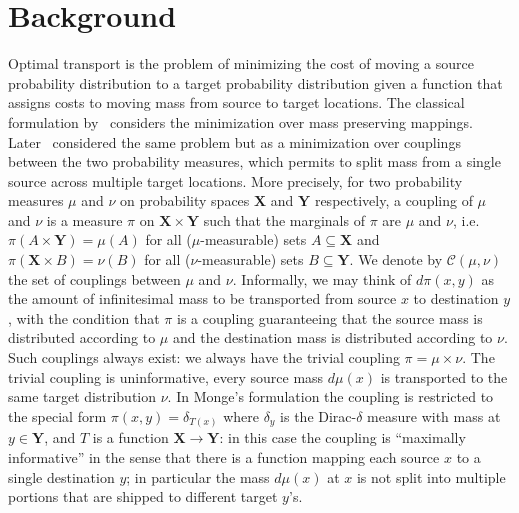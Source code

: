\documentclass[twoside,11pt]{article}
\newcommand{\coupling}[0]{\pi}
\newcommand{\Xsp}{{\mathbf{X}}}
\newcommand{\Ysp}{{\mathbf{Y}}}
\begin{document}
\section{Background}
\label{sec:background}
Optimal transport is the problem of minimizing the cost of moving a source
probability distribution to a target probability distribution given a function
that assigns costs to moving mass from source to target locations. The
classical formulation by~\citet{monge:book1781} considers the minimization over
mass preserving mappings.  Later~\citet{kantorovitch:ms1958} considered the
same problem but as a minimization over couplings between the two probability
measures, which permits to split mass from a single source across multiple
target locations.  More precisely, for two probability measures  $\mu$ and
$\nu$ on probability spaces ${\Xsp}$ and ${\Ysp}$ respectively, a coupling of
$\mu$ and $\nu$ is a measure $\coupling$ on ${\Xsp}\times{\Ysp}$ such that the
marginals of $\coupling$ are $\mu$ and $\nu$, i.e.
$\coupling(A\times{\Ysp})=\mu(A)$ for all ($\mu$-measurable) sets
$A\subseteq{\Xsp}$ and $\coupling({\Xsp}\times B)=\nu(B)$ for all
($\nu$-measurable) sets $B\subseteq{\Ysp}$. We denote by $\mathcal{C}(\mu,\nu)$
the set of couplings between $\mu$ and $\nu$.  Informally, we may think of
$d\coupling(x,y)$ as the amount of infinitesimal mass to be transported from
source $x$ to destination $y$, with the condition that $\coupling$ is a
coupling guaranteeing that the source mass is distributed according to $\mu$
and the destination mass is distributed according to $\nu$.  Such couplings
always exist: we always have the trivial coupling $\coupling=\mu\times\nu$. The
trivial coupling is uninformative, every source mass $d\mu(x)$ is transported
to the same target distribution $\nu$. In Monge's formulation the coupling is
restricted to the special form $\coupling(x,y)=\delta_{T(x)}$ where $\delta_y$
is the Dirac-$\delta$ measure with mass at $y\in{\Ysp}$, and $T$ is a function
$\Xsp\rightarrow\Ysp$: in this case the coupling is ``maximally informative''
in the sense that there is a function mapping each source $x$ to a single
destination $y$; in particular the mass $d\mu(x)$ at $x$ is not split into
multiple portions that are shipped to different target $y$'s.  
\end{document}
